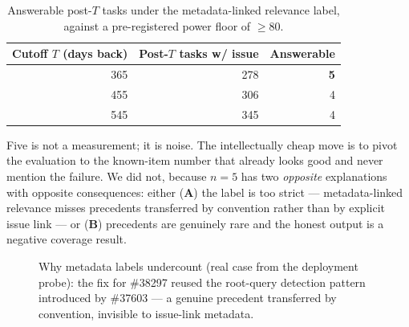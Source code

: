 \documentclass[sigconf,nonacm]{acmart}
\begin{document}
\begin{table}[h]
  \caption{Answerable post-$T$ tasks under the metadata-linked relevance
  label, against a pre-registered power floor of $\ge 80$.}
  \label{tab:underpowered}
  \begin{tabular}{rrr}
    \toprule
    Cutoff $T$ (days back) & Post-$T$ tasks w/ issue & Answerable \\
    \midrule
    365 & 278 & \textbf{5} \\
    455 & 306 & 4 \\
    545 & 345 & 4 \\
    \bottomrule
  \end{tabular}
\end{table}

Five is not a measurement; it is noise. The intellectually cheap move is
to pivot the evaluation to the known-item number that already looks good
and never mention the failure. We did not, because $n{=}5$ has two
\emph{opposite} explanations with opposite consequences: either
(\textbf{A}) the label is too strict --- metadata-linked relevance misses
precedents transferred by convention rather than by explicit issue link
--- or (\textbf{B}) precedents are genuinely rare and the honest output is
a negative coverage result.

\begin{figure}[t]
\centering
{}
\caption{Why metadata labels undercount (real case from the deployment
probe): the fix for \#38297 reused the root-query detection pattern
introduced by \#37603 --- a genuine precedent transferred by convention,
invisible to issue-link metadata.}
\label{fig:metadata}
\end{figure}
\end{document}
